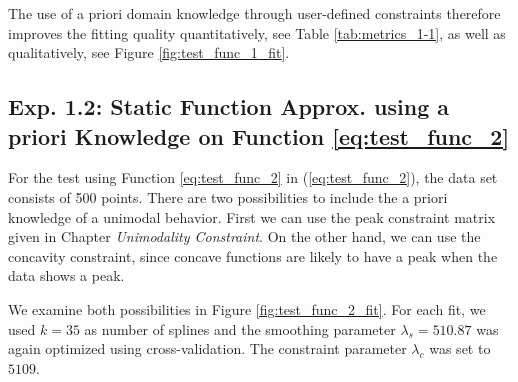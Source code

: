 \documentclass[10pt,a4paper]{article}
\begin{document}
The use of a priori domain knowledge through user-defined constraints therefore improves the fitting quality quantitatively, see Table \ref{tab:metrics_1-1}, as well as qualitatively, see Figure \ref{fig:test_func_1_fit}.





\subsection{Exp. 1.2: Static Function Approx. using a priori Knowledge on Function \ref{eq:test_func_2}} \label{subsec:exp12}

For the test using Function \ref{eq:test_func_2} in (\ref{eq:test_func_2}), the data set consists of 500 points. There are two possibilities to include the a priori knowledge of a unimodal behavior. First we can use the peak constraint matrix given in Chapter \emph{Unimodality Constraint}. On the other hand, we can use the concavity constraint, since concave functions are likely to have a peak when the data shows a peak. 

We examine both possibilities in Figure \ref{fig:test_func_2_fit}. For each fit, we used $k=35$ as number of splines and the smoothing parameter $\lambda_s=510.87$ was again optimized using cross-validation. The constraint parameter $\lambda_c$ was set to $5109$.
\end{document}
